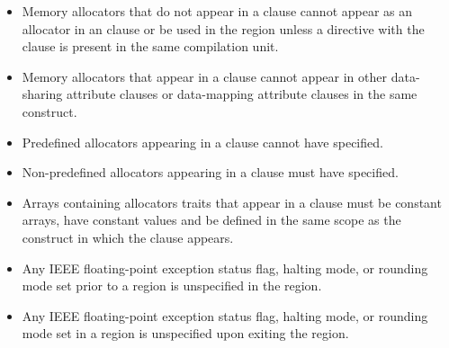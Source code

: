 \begin{itemize}
\item Memory allocators that do not appear in a  clause 
      cannot appear as an allocator in an  clause or be used in 
      the  region unless a  directive with the 
       clause is present in the same compilation unit.
\item Memory allocators that appear in a  clause cannot 
      appear in other data-sharing attribute clauses or data-mapping attribute 
      clauses in the same construct.
\item Predefined allocators appearing in a  clause cannot 
      have  specified.
\item Non-predefined allocators appearing in a  clause must 
      have  specified.
\item Arrays containing allocators traits that appear in a  
      clause must be constant arrays, have constant values and be defined in the 
      same scope as the construct in which the clause appears. 
\item Any IEEE floating-point exception status flag, halting mode, or rounding mode 
      set prior to a  region is unspecified in the region.
\item Any IEEE floating-point exception status flag, halting mode, or rounding mode 
      set in a  region is unspecified upon exiting the region.





\end{itemize}
